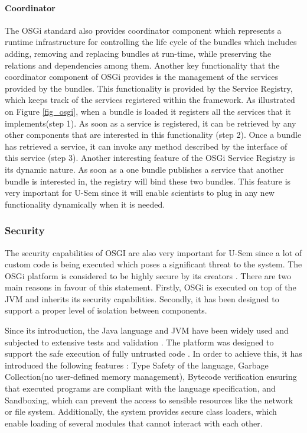 \paragraph{Coordinator}
The OSGi standard also provides coordinator component which represents a runtime infrastructure for controlling the life cycle of the bundles which includes adding, removing and replacing bundles at run-time, while preserving the relations and dependencies among them. Another key functionality that the coordinator component of OSGi provides is the management of the services provided by the bundles. This functionality is provided by the Service Registry, which keeps track of the services registered within the framework. As illustrated on Figure \ref{fig_osgi}, when a bundle is loaded it registers all the services that it implements(step 1). As soon as a service is registered, it can be retrieved by any other components that are interested in this functionality (step 2). Once a bundle has retrieved a service, it can invoke any method described by the interface of this service (step 3). Another interesting feature of the OSGi Service Registry is its dynamic nature. As soon as a one bundle publishes a service that another bundle is interested in, the registry will bind these two bundles. This feature is very important for U-Sem since it will enable scientists to plug in any new functionality dynamically when it is needed.

\subsubsection{Security}

The security capabilities of OSGI are also very important for U-Sem since a lot of custom code is being executed which poses a significant threat to the system. The OSGi platform is considered to be highly secure by its creators \cite{Parrend}. There are two main reasons in favour of this statement. Firstly, OSGi is executed on top of the JVM and inherits its security capabilities. Secondly, it has been designed to support a proper level of isolation between components.

Since its introduction, the Java language and JVM have been widely used and subjected to extensive tests and validation \cite{Parrend}. The platform was designed to support the safe execution of fully untrusted code \cite{Felten}. In order to achieve this, it has introduced the following features \cite{Gong}: Type Safety of the language, Garbage Collection(no user-defined memory management), Bytecode verification ensuring that executed programs are compliant with the language specification, and Sandboxing, which can prevent the access to sensible resources like the network or file system. Additionally, the system provides secure class loaders, which enable loading of several modules that cannot interact with each other.

